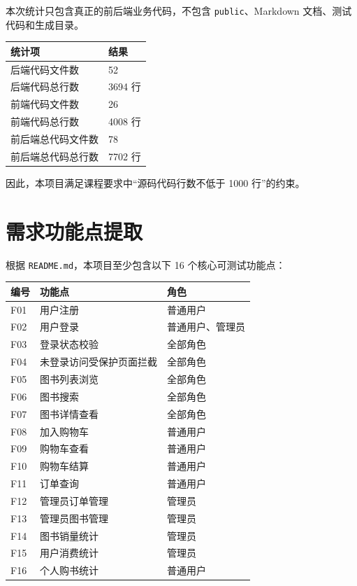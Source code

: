 \documentclass[UTF8,a4paper,12pt]{ctexart}
\begin{document}
本次统计只包含真正的前后端业务代码，不包含 \texttt{public}、Markdown 文档、测试代码和生成目录。

\begin{longtable}{p{6cm}p{6cm}}
\toprule
统计项 & 结果 \\
\midrule
后端代码文件数 & 52 \\
后端代码总行数 & 3694 行 \\
前端代码文件数 & 26 \\
前端代码总行数 & 4008 行 \\
前后端总代码文件数 & 78 \\
前后端总代码总行数 & 7702 行 \\
\bottomrule
\end{longtable}

因此，本项目满足课程要求中“源码代码行数不低于 1000 行”的约束。

\section{需求功能点提取}

根据 \texttt{README.md}，本项目至少包含以下 16 个核心可测试功能点：

\begin{longtable}{p{1.5cm}p{8cm}p{3cm}}
\toprule
编号 & 功能点 & 角色 \\
\midrule
F01 & 用户注册 & 普通用户 \\
F02 & 用户登录 & 普通用户、管理员 \\
F03 & 登录状态校验 & 全部角色 \\
F04 & 未登录访问受保护页面拦截 & 全部角色 \\
F05 & 图书列表浏览 & 全部角色 \\
F06 & 图书搜索 & 全部角色 \\
F07 & 图书详情查看 & 全部角色 \\
F08 & 加入购物车 & 普通用户 \\
F09 & 购物车查看 & 普通用户 \\
F10 & 购物车结算 & 普通用户 \\
F11 & 订单查询 & 普通用户 \\
F12 & 管理员订单管理 & 管理员 \\
F13 & 管理员图书管理 & 管理员 \\
F14 & 图书销量统计 & 管理员 \\
F15 & 用户消费统计 & 管理员 \\
F16 & 个人购书统计 & 普通用户 \\
\bottomrule
\end{longtable}
\end{document}
